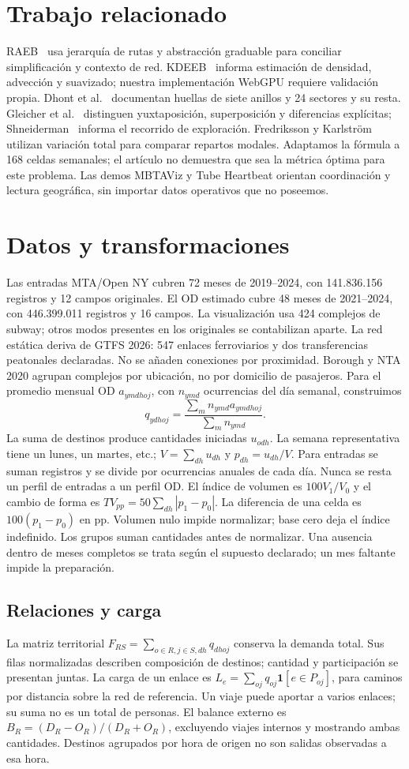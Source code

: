 \documentclass[10pt,twocolumn]{article}
\begin{document}
\section{Trabajo relacionado}
RAEB~\cite{raeb} usa jerarquía de rutas y abstracción graduable para conciliar simplificación y contexto de red. KDEEB~\cite{kdeeb} informa estimación de densidad, advección y suavizado; nuestra implementación WebGPU requiere validación propia. Dhont et al.~\cite{clock} documentan huellas de siete anillos y 24 sectores y su resta. Gleicher et al.~\cite{comparison} distinguen yuxtaposición, superposición y diferencias explícitas; Shneiderman~\cite{mantra} informa el recorrido de exploración.
Fredriksson y Karlström~\cite{tv} utilizan variación total para comparar repartos modales. Adaptamos la fórmula a 168 celdas semanales; el artículo no demuestra que sea la métrica óptima para este problema. Las demos MBTAViz y Tube Heartbeat orientan coordinación y lectura geográfica, sin importar datos operativos que no poseemos.
\section{Datos y transformaciones}
Las entradas MTA/Open NY cubren 72 meses de 2019--2024, con 141.836.156 registros y 12 campos originales. El OD estimado cubre 48 meses de 2021--2024, con 446.399.011 registros y 16 campos. La visualización usa 424 complejos de subway; otros modos presentes en los originales se contabilizan aparte. La red estática deriva de GTFS 2026: 547 enlaces ferroviarios y dos transferencias peatonales declaradas. No se añaden conexiones por proximidad. Borough y NTA 2020 agrupan complejos por ubicación, no por domicilio de pasajeros.
Para el promedio mensual OD $a_{ymdh oj}$, con $n_{ymd}$ ocurrencias del día semanal, construimos
\[q_{ydh oj}=\frac{\sum_m n_{ymd}a_{ymdh oj}}{\sum_m n_{ymd}}.\]
La suma de destinos produce cantidades iniciadas $u_{odh}$. La semana representativa tiene un lunes, un martes, etc.; $V=\sum_{dh}u_{dh}$ y $p_{dh}=u_{dh}/V$. Para entradas se suman registros y se divide por ocurrencias anuales de cada día. Nunca se resta un perfil de entradas a un perfil OD.
El índice de volumen es $100V_1/V_0$ y el cambio de forma es $TV_{pp}=50\sum_{dh}|p_1-p_0|$. La diferencia de una celda es $100(p_1-p_0)$ en pp. Volumen nulo impide normalizar; base cero deja el índice indefinido. Los grupos suman cantidades antes de normalizar. Una ausencia dentro de meses completos se trata según el supuesto declarado; un mes faltante impide la preparación.
\subsection{Relaciones y carga}
La matriz territorial $F_{RS}=\sum_{o\in R,j\in S,dh}q_{dh oj}$ conserva la demanda total. Sus filas normalizadas describen composición de destinos; cantidad y participación se presentan juntas. La carga de un enlace es $L_e=\sum_{oj}q_{oj}\mathbf1[e\in P_{oj}]$, para caminos por distancia sobre la red de referencia. Un viaje puede aportar a varios enlaces; su suma no es un total de personas.
El balance externo es $B_R=(D_R-O_R)/(D_R+O_R)$, excluyendo viajes internos y mostrando ambas cantidades. Destinos agrupados por hora de origen no son salidas observadas a esa hora.
\end{document}
